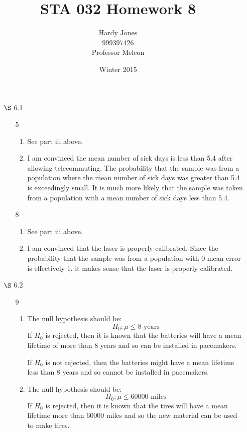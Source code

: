\documentclass[12pt,letterpaper]{article}
\title{STA 032 Homework 8\vspace{-2ex}}
\author{Hardy Jones\\
        999397426\\
        Professor Melcon\vspace{-2ex}}
\date{Winter 2015}
\begin{document}
  \maketitle

  \begin{enumerate}
    \item [$\S$ 6.1]
      \begin{enumerate}
        \item [5]
          \begin{enumerate}[label=(\arabic*)]
            \item
              See part iii above.
            \item
              I am convinced the mean number of sick days is less than 5.4 after allowing telecommuting.
              The probability that the sample was from a population where the mean number of sick days was greater than 5.4 is exceedingly small.
              It is much more likely that the sample was taken from a population with a mean number of sick days less than 5.4.
          \end{enumerate}
        \item [8]
          \begin{enumerate}[label=(\arabic*)]
            \item
              See part iii above.
            \item
              I am convinced that the laser is properly calibrated.
              Since the probability that the sample was from a population with 0 mean error is effectively 1,
              it makes sense that the laser is properly calibrated.
          \end{enumerate}
      \end{enumerate}
    \item [$\S$ 6.2]
      \begin{enumerate}
        \item [9]
          \begin{enumerate}[label=(\arabic*)]
            \item
              The null hypothesis should be:
              \[
                H_0: \mu \le 8 \textrm{ years}
              \]
              If $H_0$ is rejected,
              then it is known that the batteries will have a mean lifetime of more than 8 years and
              so can be installed in pacemakers.

              If $H_0$ is not rejected,
              then the batteries might have a mean lifetime less than 8 years and
              so cannot be installed in pacemakers.
            \item
              The null hypothesis should be:
              \[
                H_0: \mu \le \num{60000} \textrm{ miles}
              \]
              If $H_0$ is rejected,
              then it is known that the tires will have a mean lifetime more than \num{60000} miles and
              so the new material can be used to make tires.


\end{enumerate}
\end{enumerate}
\end{enumerate}
\end{document}
